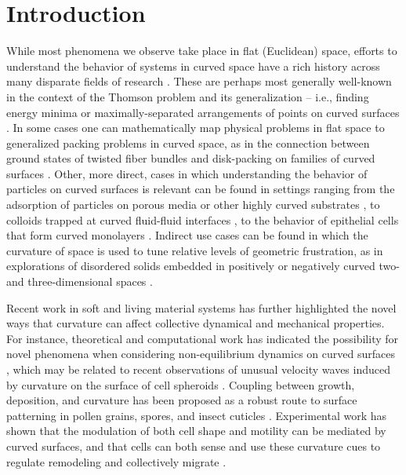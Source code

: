 \documentclass[preprint,12pt]{elsarticle}
\begin{document}
\section{Introduction}
While most phenomena we observe take place in flat (Euclidean)  space, efforts to understand the behavior of systems in curved space have a rich history across many disparate fields of research \cite{tarjus2011statistical,schamberger2023curvature}. These are perhaps  most generally well-known in the context of the Thomson problem and its generalization -- i.e., finding energy minima or maximally-separated arrangements of points on curved surfaces  \cite{thomson1904xxiv,tammes1930origin,bowick2002crystalline,agarwal2020simple,agarwal2021predicting}. In some cases one can mathematically map physical problems in flat space to generalized packing problems in curved space, as in the connection between ground states of twisted fiber bundles and disk-packing on families of curved surfaces \cite{bruss2012non,bruss2013topological}.
Other, more direct, cases in which understanding the behavior of particles on curved surfaces is relevant can be found in settings ranging from the adsorption of particles on porous media or other highly curved substrates \cite{pincus1984polymer,hanke1999critical}, to colloids trapped at curved fluid-fluid interfaces \cite{liu2016curvature}, to the behavior of epithelial cells that form curved monolayers \cite{goodwin2019smooth,yu2021adaptive,chang2022quantifying,marin2023mapping, luciano2024mechanoresponse}.
Indirect use cases can be found in which the curvature of space is used to tune relative levels of geometric frustration, as in explorations of disordered solids embedded in positively or negatively curved two- and three-dimensional spaces \cite{sausset2008tuning,turci2017glass}. 

Recent work in soft and living material systems has further highlighted the novel ways that curvature can affect collective dynamical and mechanical properties.
For instance, theoretical and computational work has indicated the possibility for novel phenomena when considering non-equilibrium dynamics on curved surfaces \cite{activesphere2015,activepart2016,topsound2017}, which may be related to recent observations of unusual velocity waves induced by curvature on the surface of cell spheroids \cite{brandstatter2023curvature}. Coupling between growth, deposition, and curvature has been proposed as a robust route to surface patterning in pollen grains, spores, and insect cuticles \cite{lavrentovich2016first,radja2019pollen}. Experimental work has shown that the modulation of both cell shape \cite{luciano2021cell} and motility \cite{pieuchot2018curvotaxis,gehrels2023curvature} can be mediated by  curved surfaces, and that cells can both sense and use these curvature cues to regulate remodeling and collectively migrate \cite{maechler2019curvature,luciano2021cell,tang2022collective}.
\end{document}
